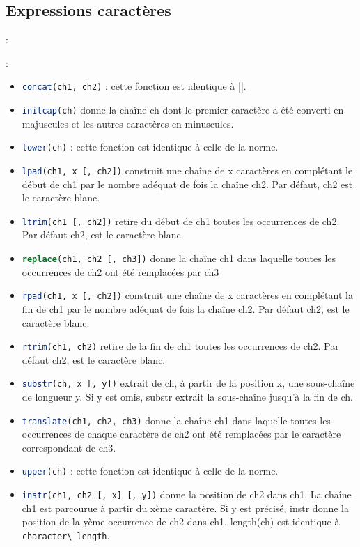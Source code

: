 \documentclass[10pt]{beamer}
\begin{document}
\subsection{Expressions caractères}
\begin{frame}{\secname : \subsecname}
    
\end{frame}

\begin{frame}[allowframebreaks]{\secname : \subsecname}
    \begin{itemize}
        \item \lstinline[language=sql]!concat(ch1, ch2)! : cette fonction est identique à ||.
        \item \lstinline[language=sql]!initcap(ch)! donne la chaîne ch dont le premier caractère a été converti en majuscules et les autres caractères en minuscules.
        \item \lstinline[language=sql]!lower(ch)! : cette fonction est identique à celle de la norme.
        \item \lstinline[language=sql]!lpad(ch1, x [, ch2])! construit une chaîne de x caractères en complétant le début de ch1 par le nombre adéquat de fois la chaîne ch2. Par défaut, ch2 est le caractère blanc.
        \item \lstinline[language=sql]!ltrim(ch1 [, ch2])! retire du début de ch1 toutes les occurrences de ch2. Par défaut ch2, est le caractère blanc.
        \item \lstinline[language=sql]!replace(ch1, ch2 [, ch3])! donne la chaîne ch1 dans laquelle toutes les occurrences de ch2 ont été remplacées par ch3
        \item \lstinline[language=sql]!rpad(ch1, x [, ch2])! construit une chaîne de x caractères en complétant la fin de ch1 par le nombre adéquat de fois la chaîne ch2. Par défaut ch2, est le caractère blanc.
        \item \lstinline[language=sql]!rtrim(ch1, ch2)! retire de la fin de ch1 toutes les occurrences de ch2. Par défaut ch2, est le caractère blanc.
        \item \lstinline[language=sql]!substr(ch, x [, y])! extrait de ch, à partir de la position x, une sous-chaîne de longueur y. Si y est omis, substr extrait la sous-chaîne jusqu’à la fin de ch.
        \item \lstinline[language=sql]!translate(ch1, ch2, ch3)! donne la chaîne ch1 dans laquelle toutes les occurrences de chaque caractère de ch2 ont été remplacées par le caractère correspondant de ch3.
        \item \lstinline[language=sql]!upper(ch)! : cette fonction est identique à celle de la norme.
        \item \lstinline[language=sql]!instr(ch1, ch2 [, x] [, y])! donne la position de ch2 dans ch1. La chaîne ch1 est parcourue à partir du xème caractère. Si y est précisé, instr donne la position de la yème occurrence de ch2 dans ch1.
              length(ch) est identique à \lstinline[language=bnf]!character\_length!.
    \end{itemize}
\end{frame}
\end{document}
